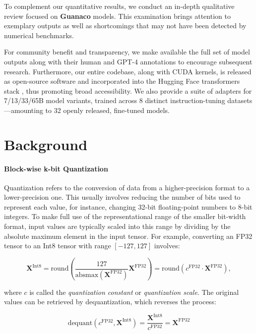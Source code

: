 To complement our quantitative results, we conduct an in-depth qualitative review focused on \textbf{Guanaco} models. This examination brings attention to exemplary outputs as well as shortcomings that may not have been detected by numerical benchmarks.

For community benefit and transparency, we make available the full set of model outputs along with their human and GPT-4 annotations to encourage subsequent research. Furthermore, our entire codebase, along with CUDA kernels, is released as open-source software and incorporated into the Hugging Face transformers stack \citep{wolf2019huggingface}, thus promoting broad accessibility. We also provide a suite of adapters for 7/13/33/65B model variants, trained across 8 distinct instruction-tuning datasets—amounting to 32 openly released, fine-tuned models.

\section{Background}
\paragraph{Block-wise k-bit Quantization} Quantization refers to the conversion of data from a higher-precision format to a lower-precision one. This usually involves reducing the number of bits used to represent each value, for instance, changing 32-bit floating-point numbers to 8-bit integers. To make full use of the representational range of the smaller bit-width format, input values are typically scaled into this range by dividing by the absolute maximum element in the input tensor. For example, converting an FP32 tensor to an Int8 tensor with range $[-127, 127]$ involves:

\begin{equation}
    \mathbf{X}^{ \text{Int8}} = \text{round}\left( \frac{127}{{\text{absmax}}(\mathbf{X}^{{\text{FP32}}})}\mathbf{X}^{{\text{FP32}}} \right) = \text{round}(c^{\text{FP32}}\cdot \mathbf{X}^{{\text{FP32}}}),
\end{equation}

where $c$ is called the {\em quantization constant} or {\em quantization scale}. The original values can be retrieved by dequantization, which reverses the process:

\begin{equation}
    \text{dequant}(c^{\text{FP32}}, \mathbf{X}^{\text{Int8}}) = \frac{\mathbf{X}^{\text{Int8}}}{c^{\text{FP32}}} = \mathbf{X}^{\text{FP32}}
\end{equation}

